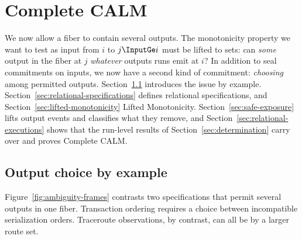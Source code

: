 \section{Complete CALM}
\label{sec:ambiguous-specifications}

We now allow a fiber to contain several outputs.  The monotonicity property we want to test as input
\ingrows from $i$ to $j\InputGe i$ must be lifted to sets: can \emph{some}
output in the fiber at $j$ \outrelbase \emph{whatever} outputs runs emit at $i$?
In addition to seal commitments on inputs, we now have a second kind of commitment: \emph{choosing}
among permitted outputs.  Section~\ref{sec:ambiguity-story} introduces the issue by
example.  Section~\ref{sec:relational-specifications} defines relational
specifications, and Section~\ref{sec:lifted-monotonicity} Lifted
Monotonicity.  Section~\ref{sec:safe-exposure} lifts
output events and classifies what they remove, and
Section~\ref{sec:relational-executions} shows that the run-level results of
Section~\ref{sec:determination} carry over and proves Complete CALM.

\subsection{Output choice by example}
\label{sec:ambiguity-story}

Figure~\ref{fig:ambiguity-frames} contrasts two specifications that permit
several outputs in one fiber.  Transaction ordering requires a choice
between incompatible serialization orders.  Traceroute observations, by
contrast, can all be \outrelpast by a larger route set.

